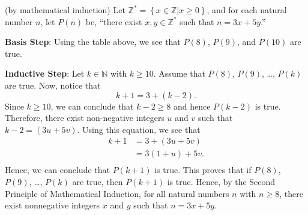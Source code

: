 \begin{myproof}
(by mathematical induction)  Let  
$\mathbb{Z}^*  = \left\{ {x \in \mathbb{Z}\left.  \right| x \geq 0} \right\}$, and for each natural number  $n$, let  $P\left( n \right)$ be,  ``there exist  $x, y \in \mathbb{Z}^*$ such that  $n = 3x + 5y$.''

\vskip6pt
\noindent
\textbf{Basis Step}:  Using the table above, we see that  $P\left( 8 \right)$, 
$P\left( 9 \right)$, and $P\left( {10} \right)$ are true. 

\vskip6pt
\noindent
\textbf{Inductive Step}:  Let  $k \in \mathbb{N}$  with  $k \geq 10$.  Assume that  
$P\left( 8 \right)$, $P\left( 9 \right)$,  \ldots , $P\left( k \right)$ are true.  Now, notice that
\[
k + 1 = 3 + \left( {k - 2} \right).
\]
Since  $k \geq 10$, we can conclude that  $k - 2 \geq 8$ and hence  
$P\left( {k - 2} \right)$ is true.  Therefore, there exist non-negative integers  $u$  and  $v$  such that   
$k - 2 = \left( {3u + 5v} \right)$.  Using this equation, we see that
\[
\begin{aligned}
k + 1 &= 3  + \left( {3u + 5v} \right) \\ 
      &= 3\left( {1 + u} \right) + 5v. \\ 
\end{aligned}
\]
Hence, we can conclude that  $P\left( {k + 1} \right)$ is true.  This proves that if  
$P\left( 8 \right)$, $P\left( 9 \right)$,  \ldots , $P\left( k \right) $ are true, then  
$P\left( {k + 1} \right)$ is true.  Hence, by the Second Principle of Mathematical Induction, for all natural numbers  $n$  with  $n \geq 8$, there exist nonnegative integers  $x$  and  $y$  such that  $n = 3x + 5y$.
\end{myproof}
\hbreak


\endinput
